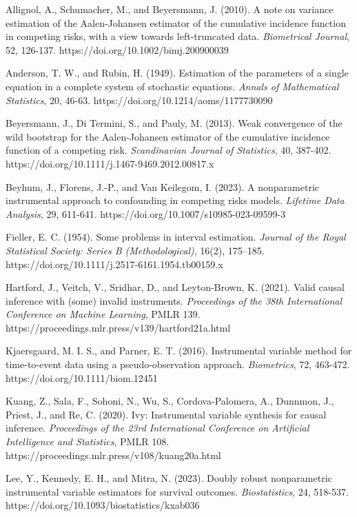 \documentclass[
  10pt,
  letterpaper,
]{article}
\begin{document}
Allignol, A., Schumacher, M., and Beyersmann, J. (2010). A note on
variance estimation of the Aalen-Johansen estimator of the cumulative
incidence function in competing risks, with a view towards
left-truncated data. \emph{Biometrical Journal}, 52, 126-137.
https://doi.org/10.1002/bimj.200900039

Anderson, T. W., and Rubin, H. (1949). Estimation of the parameters of a
single equation in a complete system of stochastic equations.
\emph{Annals of Mathematical Statistics}, 20, 46-63.
https://doi.org/10.1214/aoms/1177730090

Beyersmann, J., Di Termini, S., and Pauly, M. (2013). Weak convergence
of the wild bootstrap for the Aalen-Johansen estimator of the cumulative
incidence function of a competing risk. \emph{Scandinavian Journal of
Statistics}, 40, 387-402.
https://doi.org/10.1111/j.1467-9469.2012.00817.x

Beyhum, J., Florens, J.-P., and Van Keilegom, I. (2023). A nonparametric
instrumental approach to confounding in competing risks models.
\emph{Lifetime Data Analysis}, 29, 611-641.
https://doi.org/10.1007/s10985-023-09599-3

Fieller, E. C. (1954). Some problems in interval estimation.
\emph{Journal of the Royal Statistical Society: Series B
(Methodological)}, 16(2), 175--185.
https://doi.org/10.1111/j.2517-6161.1954.tb00159.x

Hartford, J., Veitch, V., Sridhar, D., and Leyton-Brown, K. (2021).
Valid causal inference with (some) invalid instruments.
\emph{Proceedings of the 38th International Conference on Machine
Learning}, PMLR 139. https://proceedings.mlr.press/v139/hartford21a.html

Kjaersgaard, M. I. S., and Parner, E. T. (2016). Instrumental variable
method for time-to-event data using a pseudo-observation approach.
\emph{Biometrics}, 72, 463-472. https://doi.org/10.1111/biom.12451

Kuang, Z., Sala, F., Sohoni, N., Wu, S., Cordova-Palomera, A., Dunnmon,
J., Priest, J., and Re, C. (2020). Ivy: Instrumental variable synthesis
for causal inference. \emph{Proceedings of the 23rd International
Conference on Artificial Intelligence and Statistics}, PMLR 108.
https://proceedings.mlr.press/v108/kuang20a.html

Lee, Y., Kennedy, E. H., and Mitra, N. (2023). Doubly robust
nonparametric instrumental variable estimators for survival outcomes.
\emph{Biostatistics}, 24, 518-537.
https://doi.org/10.1093/biostatistics/kxab036
\end{document}
